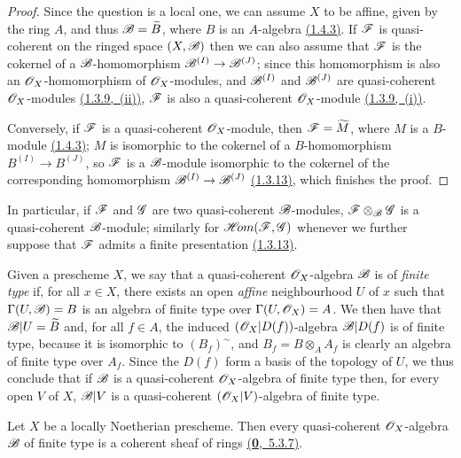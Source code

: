 \begin{proof}
\label{proof-prop-1.9.6.1}
Since the question is a local one, we can assume $X$ to be affine, given by the ring $A$, and thus $\mathscr{B}=\widetilde{B}$, where $B$ is an $A$-algebra \hyperref[cor-1.1.4.3]{(1.4.3)}.
If $\mathscr{F}$ is quasi-coherent on the ringed space $(X,\mathscr{B})$ then we can also assume that $\mathscr{F}$ is the cokernel of a $\mathscr{B}$-homomorphism $\mathscr{B}^{(I)}\to\mathscr{B}^{(J)}$; since this homomorphism is also an $\mathscr{O}_X$-homomorphism of $\mathscr{O}_X$-modules, and $\mathscr{B}^{(I)}$ and $\mathscr{B}^{(J)}$ are quasi-coherent $\mathscr{O}_X$-modules \hyperref[cor-1.1.3.9]{(1.3.9,~(ii))}, $\mathscr{F}$ is also a quasi-coherent $\mathscr{O}_X$-module \hyperref[cor-1.1.3.9]{(1.3.9,~(i))}.

Conversely, if $\mathscr{F}$ is a quasi-coherent $\mathscr{O}_X$-module, then $\mathscr{F}=\widetilde{M}$, where $M$ is a $B$-module \hyperref[cor-1.1.4.3]{(1.4.3)}; $M$ is isomorphic to the cokernel of a $B$-homomorphism $B^{(I)}\to B^{(J)}$, so $\mathscr{F}$ is a $\mathscr{B}$-module isomorphic to the cokernel of the corresponding homomorphism $\mathscr{B}^{(I)}\to\mathscr{B}^{(J)}$ \hyperref[env-1.1.3.13]{(1.3.13)}, which finishes the proof.
\end{proof}

In particular, if $\mathscr{F}$ and $\mathscr{G}$ are two quasi-coherent $\mathscr{B}$-modules, $\mathscr{F}\otimes_{\mathscr{B}}\mathscr{G}$ is a quasi-coherent $\mathscr{B}$-module; similarly for $\mathscr{H}\!{om}(\mathscr{F},\mathscr{G})$ whenever we further suppose that $\mathscr{F}$ admits a finite presentation \hyperref[env-1.1.3.13]{(1.3.13)}.

\begin{env}[9.6.2]
\label{env-1.9.6.2}
Given a prescheme $X$, we say that a quasi-coherent $\mathscr{O}_X$-algebra $\mathscr{B}$ is of \emph{finite type} if, for all $x\in X$, there exists an open \emph{affine} neighbourhood $U$ of $x$ such that $\Gamma(U,\mathscr{B})=B$ is an algebra of finite type over $\Gamma(U,\mathscr{O}_X)=A$.
We then have that $\mathscr{B}|U=\widetilde{B}$ and, for all $f\in A$, the induced $(\mathscr{O}_X|D(f))$-algebra $\mathscr{B}|D(f)$ is of finite type, because it is isomorphic to $(B_f)^{\sim}$, and $B_f=B\otimes_A A_f$ is clearly an algebra of finite type over $A_f$.
Since the $D(f)$ form a basis of the topology of $U$, we thus conclude that if $\mathscr{B}$ is a quasi-coherent $\mathscr{O}_X$-algebra of finite type then, for every open $V$ of $X$, $\mathscr{B}|V$ is a quasi-coherent $(\mathscr{O}_X|V)$-algebra of finite type.
\end{env}

\begin{prop}[9.6.3]
\label{prop-1.9.6.3}
Let $X$ be a locally Noetherian prescheme.
Then every quasi-coherent $\mathscr{O}_X$-algebra $\mathscr{B}$ of finite type is a coherent sheaf of rings \hyperref[env-0.5.3.7]{(\textbf{0},~5.3.7)}.
\end{prop}

